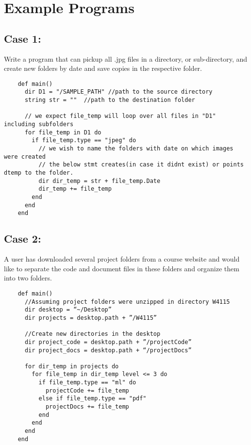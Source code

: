 \documentclass[11pt]{article}
\begin{document}
\newpage
\section{Example Programs}\label{results}
\subsection{Case 1:}
Write a program that can pickup all .jpg files in a directory, or sub-directory, and create new folders by date and save copies in the respective folder.
\begin{listing}[H]
  \begin{verbatim}
    def main()
      dir D1 = "/SAMPLE_PATH" //path to the source directory
      string str = ""  //path to the destination folder

      // we expect file_temp will loop over all files in "D1" including subfolders
      for file_temp in D1 do
        if file_temp.type == "jpeg" do
          // we wish to name the folders with date on which images were created
          // the below stmt creates(in case it didnt exist) or points dtemp to the folder.
          dir dir_temp = str + file_temp.Date
          dir_temp += file_temp
        end
      end
    end
  \end{verbatim}
\end{listing}

\subsection{Case 2:}
A user has downloaded several project folders from a course website and would like to separate the code and document files in these folders and organize them into two folders.
\begin{listing}[H]
  \begin{verbatim}
    def main()
      //Assuming project folders were unzipped in directory W4115
      dir desktop = “~/Desktop”
      dir projects = desktop.path + ”/W4115”

      //Create new directories in the desktop
      dir project_code = desktop.path + ”/projectCode”
      dir project_docs = desktop.path + “/projectDocs”

      for dir_temp in projects do
        for file_temp in dir_temp level <= 3 do
          if file_temp.type == "ml" do
            projectCode += file_temp
          else if file_temp.type == "pdf"
            projectDocs += file_temp
          end
        end
      end
    end
  \end{verbatim}
\end{listing}
\end{document}
